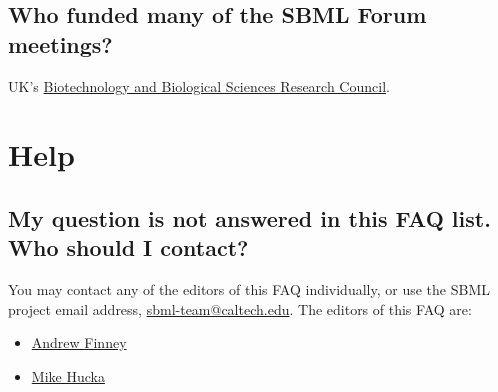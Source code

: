 \documentclass{sbmlfaq}
\begin{document}
\subsection{Who funded many of the SBML Forum meetings?}

UK's \href{http://www.bbsrc.ac.uk/}{Biotechnology and Biological Sciences
  Research Council}.

\section{Help}

\subsection{My question is not answered in this FAQ list. Who should I contact?}
\label{sec:not-answered}

You may contact any of the editors of this FAQ individually, or use the
SBML project email address,
\href{mailto:sbml-team@caltech.edu}{sbml-team@caltech.edu}.  The editors
of this FAQ are:

\begin{itemize}
\item \href{mailto:afinney@cds.caltech.edu}{Andrew Finney}
\item \href{mailto:mhucka@cds.caltech.edu}{Mike Hucka}
\end{itemize}
\end{document}
